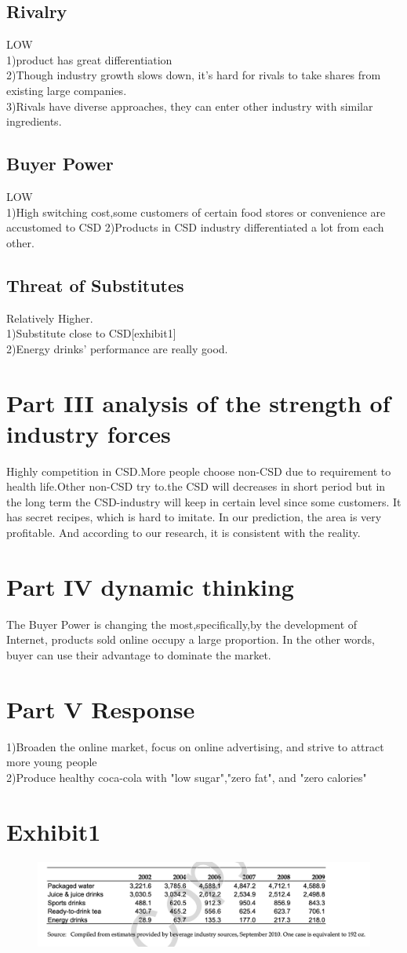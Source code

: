 \documentclass[english]{article}
\begin{document}
\subsection{Rivalry}
LOW\\
1)product has great differentiation\\
2)Though industry growth slows down, it's hard for rivals to take shares from existing large companies.\\
3)Rivals have diverse approaches, they can enter other industry with similar ingredients.
\subsection{Buyer Power}
LOW\\
1)High switching cost,some customers of certain food stores or convenience are accustomed to CSD
2)Products in CSD industry differentiated a lot from each other.
\subsection{Threat of Substitutes}
Relatively Higher.\\
1)Substitute close to CSD[exhibit1]\\
2)Energy drinks' performance are really good.


\section{Part III  analysis of the strength of industry forces}
Highly competition in CSD.More people choose non-CSD due to requirement to health life.Other non-CSD try to.the CSD will decreases in short period but in the long term the CSD-industry will keep in certain level since some customers. It has secret recipes, which is hard to imitate.
In our prediction, the area is very profitable.
And according to our research, it is consistent with the reality.

\section{Part IV dynamic thinking}
The Buyer Power is changing the most,specifically,by the development of Internet, products sold online occupy a large proportion. In the other words, buyer can use their advantage to dominate the market.
\section{Part V  Response}
1)Broaden the online market, focus on online advertising, and strive to attract more young people\\
2)Produce healthy coca-cola with "low sugar","zero fat", and "zero calories"
\section{Exhibit1}
\begin{figure}[h]
\centering
\includegraphics[width=16cm]{pics/ENTR1006/3.png}
\end{figure}

\end{document}
